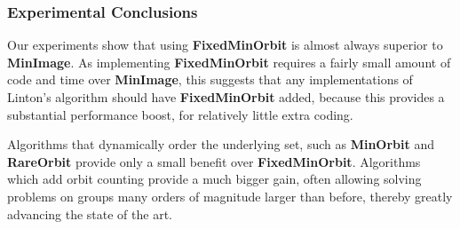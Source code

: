 \subsubsection{Experimental Conclusions}

Our experiments show that using \textbf{FixedMinOrbit} is almost always superior
to \textbf{MinImage}. As implementing \textbf{FixedMinOrbit} requires a fairly small
amount of code and time over \textbf{MinImage}, this suggests that any implementations of
Linton's algorithm should have \textbf{FixedMinOrbit} added, because this provides a substantial
performance boost, for relatively little extra coding.

Algorithms that dynamically
order the underlying set, such as \textbf{MinOrbit} and \textbf{RareOrbit}
provide only a small benefit over \textbf{FixedMinOrbit}. Algorithms which add
orbit counting provide a much bigger gain, often allowing solving problems on
groups many orders of magnitude larger than before, thereby greatly advancing the state
of the art.
